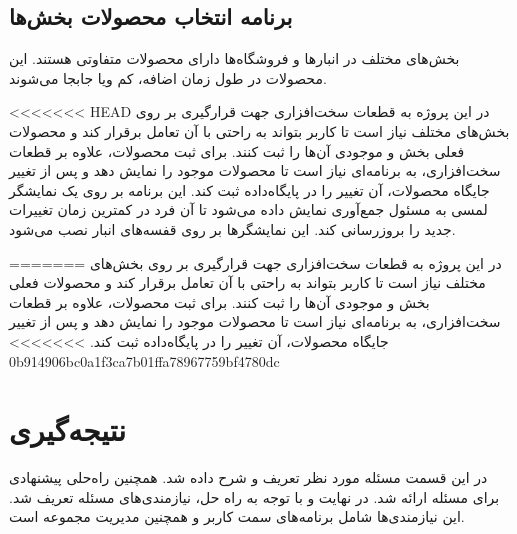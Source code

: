 \subsection{برنامه انتخاب محصولات بخش‌ها‌}
بخش‌های مختلف در انبارها و فروشگاه‌ها دارای محصولات متفاوتی هستند. این محصولات در طول زمان اضافه، کم ویا جابجا می‌شوند.

<<<<<<< HEAD
در این پروژه به قطعات سخت‌افزاری جهت قرارگیری بر روی بخش‌های مختلف نیاز است تا کاربر بتواند به راحتی با آن تعامل برقرار کند و محصولات فعلی بخش  و موجودی آن‌ها را ثبت کنند. برای ثبت محصولات، علاوه بر قطعات سخت‌افزاری، به برنامه‌ای نیاز است تا محصولات موجود را نمایش دهد و پس از تغییر جایگاه محصولات، آن تغییر را در پایگاه‌داده ثبت کند. این برنامه بر روی یک نمایشگر لمسی به مسئول جمع‌آوری نمایش داده می‌شود تا آن فرد در کمترین زمان تغییرات جدید را بروزرسانی کند. این نمایشگرها بر روی قفسه‌های انبار نصب می‌شود.

=======
در این پروژه به قطعات سخت‌افزاری جهت قرارگیری بر روی بخش‌های مختلف نیاز است تا کاربر بتواند به راحتی با آن تعامل برقرار کند و محصولات فعلی بخش  و موجودی آن‌ها را ثبت کنند. برای ثبت محصولات، علاوه بر قطعات سخت‌افزاری، به برنامه‌ای نیاز است تا محصولات موجود را نمایش دهد و پس از تغییر جایگاه محصولات، آن تغییر را در پایگاه‌داده ثبت کند.
>>>>>>> 0b914906bc0a1f3ca7b01ffa78967759bf4780dc

\section{نتیجه‌گیری}
در این قسمت مسئله مورد نظر تعریف و شرح داده شد. همچنین راه‌حلی پیشنهادی برای مسئله ارائه شد. در نهایت و با توجه به راه حل، نیازمندی‌های مسئله تعریف شد. این نیازمندی‌ها شامل برنامه‌های سمت کاربر و همچنین مدیریت مجموعه است.
